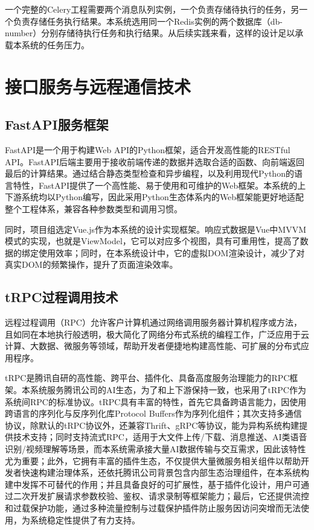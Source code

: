 一个完整的Celery工程需要两个消息队列实例，一个负责存储待执行的任务，另一个负责存储任务执行结果。本系统选用同一个Redis实例的两个数据库（db-number）分别存储待执行任务和执行结果。从后续实践来看，这样的设计足以承载本系统的任务压力。

\section{接口服务与远程通信技术}

\subsection{FastAPI服务框架}

FastAPI是一个用于构建Web API的Python框架，适合开发高性能的RESTful API。FastAPI后端主要用于接收前端传递的数据并选取合适的函数、向前端返回最后的计算结果\cite{15}。通过结合静态类型检查和异步编程，以及利用现代Python的语言特性，FastAPI提供了一个高性能、易于使用和可维护的Web框架。本系统的上下游系统均以Python编写，因此采用Python生态体系内的Web框架能更好地适配整个工程体系，兼容各种参数类型和调用习惯。

同时，项目组选定Vue.js作为本系统的设计实现框架。响应式数据是Vue中MVVM模式的实现，也就是ViewModel，它可以对应多个视图，具有可重用性，提高了数据的绑定使用效率；同时，在本系统设计中，它的虚拟DOM渲染设计，减少了对真实DOM的频繁操作，提升了页面渲染效率\cite{20}。

\subsection{tRPC过程调用技术}

远程过程调用（RPC）允许客户计算机通过网络调用服务器计算机程序或方法，且如同在本地执行般透明，极大简化了网络分布式系统的编程工作，广泛应用于云计算、大数据、微服务等领域，帮助开发者便捷地构建高性能、可扩展的分布式应用程序\cite{2}。

tRPC是腾讯自研的高性能、跨平台、插件化、具备高度服务治理能力的RPC框架。本系统服务腾讯公司的AI生态，为了和上下游保持一致，也采用了tRPC作为系统间RPC的标准协议。tRPC具有丰富的特性，首先它具备跨语言能力，因使用跨语言的序列化与反序列化库Protocol Buffers作为序列化组件；其次支持多通信协议，除默认的tRPC协议外，还兼容Thrift、gRPC等协议，能为异构系统构建提供技术支持；同时支持流式RPC，适用于大文件上传/下载、消息推送、AI类语音识别/视频理解等场景，而本系统需承接大量AI数据传输与交互需求，因此该特性尤为重要；此外，它拥有丰富的插件生态，不仅提供大量微服务相关组件以帮助开发者快速构建治理体系，还依托腾讯公司背景包含内部生态治理组件，在本系统构建中发挥不可替代的作用；并且具备良好的可扩展性，基于插件化设计，用户可通过二次开发扩展请求参数校验、鉴权、请求录制等框架能力；最后，它还提供流控和过载保护功能，通过多种流量控制与过载保护插件防止服务因访问突增而无法使用，为系统稳定性提供了有力支持。

